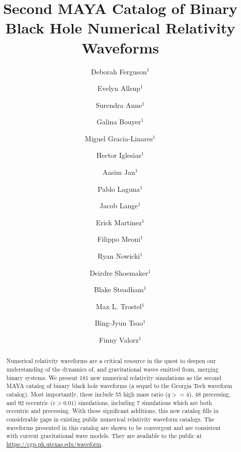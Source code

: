 \documentclass[
twocolumn,prd,
showpacs,
nofootinbib,
amsmath,amssymb,
superscriptaddress]{revtex4-1}
\begin{document}
\title{Second MAYA Catalog of Binary Black Hole Numerical Relativity Waveforms}


\author{Deborah Ferguson$^{1}$}\noaffiliation
\author{Evelyn Allsup$^{1}$}\noaffiliation
\author{Surendra Anne$^{1}$}\noaffiliation
\author{Galina Bouyer$^{1}$}\noaffiliation
\author{Miguel Gracia-Linares$^{1}$}\noaffiliation
\author{Hector Iglesias$^{1}$}\noaffiliation
\author{Aasim Jan$^{1}$}\noaffiliation
\author{Pablo Laguna$^{1}$}\noaffiliation
\author{Jacob Lange$^{1}$}\noaffiliation
\author{Erick Martinez$^{1}$}\noaffiliation
\author{Filippo Meoni$^{1}$}\noaffiliation
\author{Ryan Nowicki$^{1}$}\noaffiliation
\author{Deirdre Shoemaker$^{1}$}\noaffiliation
\author{Blake Steadham$^{1}$}\noaffiliation
\author{Max L. Trostel$^{1}$}\noaffiliation
\author{Bing-Jyun Tsao$^{1}$}\noaffiliation
\author{Finny Valorz$^{1}$}\noaffiliation

\begin{abstract}
Numerical relativity waveforms are a critical resource in the quest to  deepen our understanding of the dynamics of, and gravitational waves emitted from, merging binary systems.
We present 181 new numerical relativity simulations as the second MAYA catalog of binary black hole waveforms (a sequel to the Georgia Tech waveform catalog). 
Most importantly, these include 55 high mass ratio ($q>=4$), 48 precessing,  and 92 eccentric ($e>0.01$) simulations,  including 7 simulations which are both eccentric and precessing.
With these significant additions, this new catalog fills in considerable gaps in existing public numerical relativity waveform catalogs. 
The waveforms presented in this catalog are shown to be convergent and are consistent with current gravitational wave models.  
They are available to the public at \url{https://cgp.ph.utexas.edu/waveform}.
\end{abstract}

\maketitle
\end{document}
